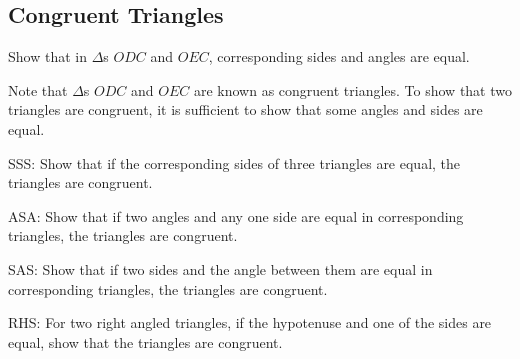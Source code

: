 \subsection{Congruent Triangles}
%
\begin{problem}
	Show that in $\Delta$s $ODC$ and $OEC$, corresponding sides and angles are equal.
\end{problem}
\begin{definition}
	Note that    $\Delta$s $ODC$ and $OEC$ are known as congruent triangles.  To show that two triangles are congruent, it is sufficient to show that some angles and sides are equal.
\end{definition}
\begin{problem}
SSS:	Show that if the corresponding sides of three triangles are equal, the triangles are congruent.
\end{problem}
\begin{problem}
ASA:	Show that if two angles and any one side  are equal in corresponding triangles, the triangles are congruent.
\end{problem}
\begin{problem}
SAS:	Show that if two sides and the angle between them are equal in corresponding triangles, the triangles are congruent.
\end{problem}
\begin{problem}
RHS:	For two right angled triangles, if the hypotenuse and one of the sides are equal, show that the triangles are congruent.
\end{problem}
